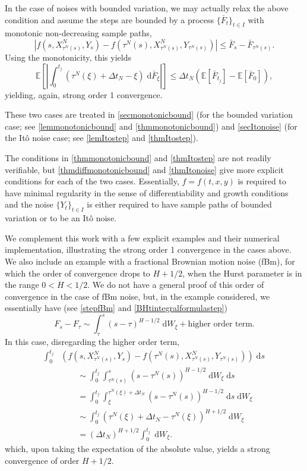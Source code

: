 \documentclass[reqno,12pt]{amsart}
\theoremstyle{plain}%
\theoremstyle{definition}
\begin{document}
In the case of noises with bounded variation, we may actually relax the above condition and assume the steps are bounded by a process $\{\bar F_t\}_{t\in I}$ with monotonic non-decreasing sample paths,
\[
    |f(s, X_{\tau^N(s)}^N, Y_s) - f(\tau^N(s), X_{\tau^N(s)}^N, Y_{\tau^N(s)})| \leq \bar F_s - \bar F_{\tau^N(s)}.
\]
Using the monotonicity, this yields
\[
    \mathbb{E}\left[\left| \int_0^{t_j} (\tau^N(\xi) + \Delta t_N - \xi) \;\mathrm{d} \bar F_\xi \right|\right] \leq \Delta t_N \left(\mathbb{E}[\bar F_{t_j}] - \mathbb{E}[\bar F_0]\right),
\]
yielding, again, strong order 1 convergence.

These two cases are treated in \cref{secmonotonicbound} (for the bounded variation case; see \cref{lemmonotonicbound} and \cref{thmmonotonicbound}) and \cref{secItonoise} (for the It\^o noise case; see \cref{lemItostep} and \cref{thmItostep}).

The conditions in \cref{thmmonotonicbound} and \cref{thmItostep} are not readily verifiable, but \cref{thmdiffmonotonicbound} and \cref{thmItonoise} give more explicit conditions for each of the two cases. Essentially, $f=f(t, x, y)$ is required to have minimal regularity in the sense of differentiability and growth conditions and the noise $\{Y_t\}_{t\in I}$ is either required to have sample paths of bounded variation or to be an It\^o noise.

We complement this work with a few explicit examples and their numerical implementation, illustrating the strong order 1 convergence in the cases above. We also include an example with a fractional Brownian motion noise (fBm), for which the order of convergence drops to $H + 1/2$, when the Hurst parameter is in the range $0 < H < 1/2$. We do not have a general proof of this order of convergence in the case of fBm noise, but, in the example considered, we essentially have (see \eqref{stepfBm} and \eqref{BHtintegralformulastep})
\[
    F_s - F_\tau \sim \int_\tau^s (s-\tau)^{H-1/2}\;\mathrm{d}W_\xi + \text{higher order term}.
\]
In this case, disregarding the higher order term,
\begin{align*}
    \int_0^{t_j} & \left( f(s, X_{\tau^N(s)}^N, Y_s) - f(\tau^N(s), X_{\tau^N(s)}^N, Y_{\tau^N(s)}) \right)\;\mathrm{d}s \\ 
    & \qquad \sim \int_0^{t_j} \int_{\tau^N(s)}^s (s-\tau^N(s))^{H-1/2} \;\mathrm{d} W_\xi\;\mathrm{d}s \\
    & \qquad = \int_0^{t_j} \int_{\xi}^{\tau^N(\xi) + \Delta t_N} (s-\tau^N(s))^{H-1/2} \;\mathrm{d}s \;\mathrm{d} W_\xi \\
    & \qquad \sim \int_0^{t_j} (\tau^N(\xi) + \Delta t_N - \tau^N(\xi))^{H+1/2} \;\mathrm{d} W_\xi \\
    & \qquad = (\Delta t_N)^{H+1/2} \int_0^{t_j} \;\mathrm{d} W_\xi.
\end{align*}
which, upon taking the expectation of the absolute value, yields a strong convergence of order $H + 1/2$.
\end{document}
